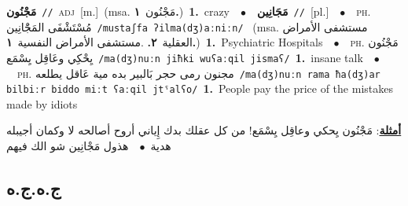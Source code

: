 \documentclass[10pt,a4paper,twoside]{article} %
\begin{document}
\begin{multicols}{2}
{\setlength\topsep{0pt}\textbf{\foreignlanguage{arabic}{مَجْنُون}}\ {\color{gray}\texttt{//}\color{black}}\ \textsc{adj}\ [m.]\ \color{gray}(msa. \foreignlanguage{arabic}{مَجْنُون}~\foreignlanguage{arabic}{\textbf{١.}})\color{black}\ \textbf{1.}~crazy\ \ $\bullet$\ \ \setlength\topsep{0pt}\textbf{\foreignlanguage{arabic}{مَجَانِين}}\ {\color{gray}\texttt{//}\color{black}}\ [pl.]\ \ $\bullet$\ \ \textsc{ph.} \color{gray} \foreignlanguage{arabic}{مُسْتَشْفَى المَجَْانِين}\color{black}\ {\color{gray}\texttt{/{\sffamily mustaʃfa ʔilma(dʒ)aːniːn}/}\color{black}}\ \color{gray} (msa. \foreignlanguage{arabic}{مستشفى الأمراض العقلية}~\foreignlanguage{arabic}{\textbf{٢.}}  .\foreignlanguage{arabic}{مستشفى الأمراض النفسية}~\foreignlanguage{arabic}{\textbf{١.}})\color{black}\ \textbf{1.}~Psychiatric Hospitals\ \ $\bullet$\ \ \textsc{ph.} \color{gray} \foreignlanguage{arabic}{مَجْنُون يِحْكِي وعَاقِل يِسْمَع}\color{black}\ {\color{gray}\texttt{/{\sffamily ma(dʒ)nuːn jiħki wuʕaːqil jismaʕ}/}\color{black}}\ \textbf{1.}~insane talk\ \ $\bullet$\ \ \textsc{ph.} \color{gray} \foreignlanguage{arabic}{مجنون رمى حجر بَالبير بده مية عَاقل يطلعه}\color{black}\ {\color{gray}\texttt{/{\sffamily ma(dʒ)nuːn rama ħa(dʒ)ar bilbiːr biddo miːt ʕaːqil jtˤalʕo}/}\color{black}}\ \textbf{1.}~People pay the price of the mistakes made by idiots\  \begin{flushright}\color{gray}\foreignlanguage{arabic}{\textbf{\underline{\foreignlanguage{arabic}{أمثلة}}}: مَجْنُون يِحكي وعاقِل يِسْمَع! من كل عقلك بدك إِياني أروح أصالحه لا وكمان أجيبله هدية\ $\bullet$\ \  هذول مَجْانِين شو الك فيهم}\end{flushright}\color{black}} \vspace{2mm}

\vspace{-3mm}
\subsection*{\color{blue}\foreignlanguage{arabic}{ج.ه.ج.ه}\color{blue}{}} 


\end{multicols}
\end{document}
